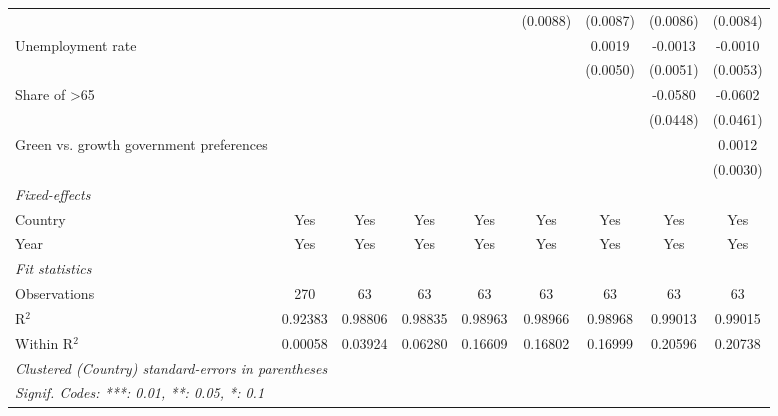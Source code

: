 \begin{table}[htbp]
\begin{tabular}{lcccccccc}
                                                                &          &          &          &                & (0.0088)       & (0.0087)       & (0.0086)       & (0.0084)\\   
      Unemployment rate                                         &          &          &          &                &                & 0.0019         & -0.0013        & -0.0010\\   
                                                                &          &          &          &                &                & (0.0050)       & (0.0051)       & (0.0053)\\   
      Share of >65                                              &          &          &          &                &                &                & -0.0580        & -0.0602\\   
                                                                &          &          &          &                &                &                & (0.0448)       & (0.0461)\\   
      Green vs. growth government preferences                   &          &          &          &                &                &                &                & 0.0012\\   
                                                                &          &          &          &                &                &                &                & (0.0030)\\   
      \midrule
      \emph{Fixed-effects}\\
      Country                                                   & Yes      & Yes      & Yes      & Yes            & Yes            & Yes            & Yes            & Yes\\  
      Year                                                      & Yes      & Yes      & Yes      & Yes            & Yes            & Yes            & Yes            & Yes\\  
      \midrule
      \emph{Fit statistics}\\
      Observations                                              & 270      & 63       & 63       & 63             & 63             & 63             & 63             & 63\\  
      R$^2$                                                     & 0.92383  & 0.98806  & 0.98835  & 0.98963        & 0.98966        & 0.98968        & 0.99013        & 0.99015\\  
      Within R$^2$                                              & 0.00058  & 0.03924  & 0.06280  & 0.16609        & 0.16802        & 0.16999        & 0.20596        & 0.20738\\  
      \midrule \midrule
      \multicolumn{9}{l}{\emph{Clustered (Country) standard-errors in parentheses}}\\
      \multicolumn{9}{l}{\emph{Signif. Codes: ***: 0.01, **: 0.05, *: 0.1}}\\
   \end{tabular}
\end{table}


